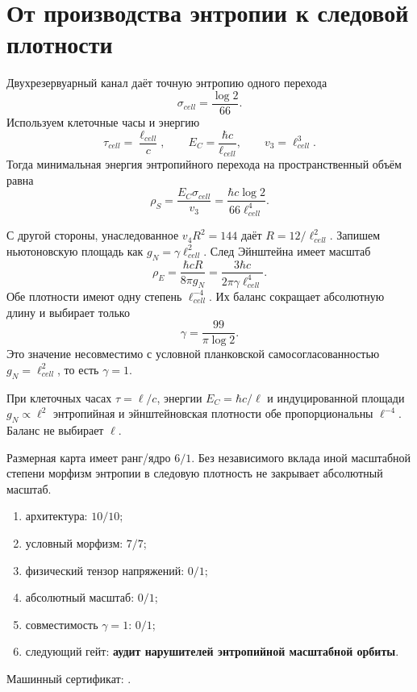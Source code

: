 \chapter{От производства энтропии к следовой плотности}
\label{ch:v10-entropy-trace-anomaly-morphism}
Двухрезервуарный канал даёт точную энтропию одного перехода
\begin{equation}\sigma_{cell}=\frac{\log2}{66}.
\end{equation}
Используем клеточные часы и энергию
\begin{equation}\tau_{cell}=\frac{\ell_{cell}}c,\qquad
E_C=\frac{\hbar c}{\ell_{cell}},\qquad v_3=\ell_{cell}^3.
\end{equation}
Тогда минимальная энергия энтропийного перехода на пространственный объём
равна
\begin{equation}\rho_S=\frac{E_C\sigma_{cell}}{v_3}
=\frac{\hbar c\log2}{66\ell_{cell}^4}.
\end{equation}

С другой стороны, унаследованное $v_4R^2=144$ даёт
$R=12/\ell_{cell}^2$. Запишем ньютоновскую площадь как
$g_N=\gamma\ell_{cell}^2$. След Эйнштейна имеет масштаб
\begin{equation}\rho_E=\frac{\hbar cR}{8\pi g_N}
=\frac{3\hbar c}{2\pi\gamma\ell_{cell}^4}.
\end{equation}
Обе плотности имеют одну степень $\ell_{cell}^{-4}$. Их баланс сокращает
абсолютную длину и выбирает только
\begin{equation}\boxed{\gamma=\frac{99}{\pi\log2}}.
\end{equation}
Это значение несовместимо с условной планковской самосогласованностью
$g_N=\ell_{cell}^2$, то есть $\gamma=1$.

\begin{theorem}
При клеточных часах $\tau=\ell/c$, энергии $E_C=\hbar c/\ell$ и
индуцированной площади $g_N\propto\ell^2$ энтропийная и эйнштейновская
плотности обе пропорциональны $\ell^{-4}$. Баланс не выбирает $\ell$.
\end{theorem}
\begin{nogocriterion}
Размерная карта имеет ранг/ядро $6/1$. Без независимого вклада иной
масштабной степени морфизм энтропии в следовую плотность не закрывает
абсолютный масштаб.
\end{nogocriterion}
\begin{protocol}\begin{enumerate}\item архитектура: \textbf{$10/10$};
\item условный морфизм: \textbf{$7/7$};\item физический тензор напряжений: \textbf{$0/1$};
\item абсолютный масштаб: \textbf{$0/1$};\item совместимость $\gamma=1$: \textbf{$0/1$};
\item следующий гейт: \textbf{аудит нарушителей энтропийной масштабной орбиты}.\end{enumerate}\end{protocol}
Машинный сертификат: .